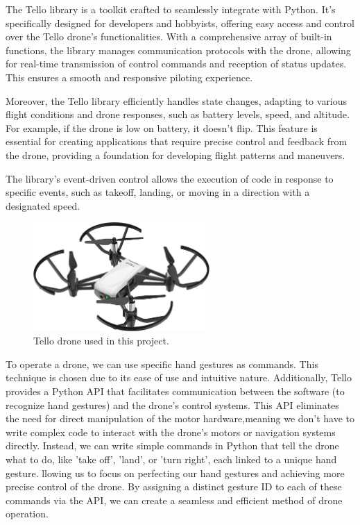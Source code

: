 The Tello library is a toolkit crafted to seamlessly integrate with Python. It's specifically designed for developers and hobbyists, offering easy access and control over the Tello drone's functionalities. With a comprehensive array of built-in functions, the library manages communication protocols with the drone, allowing for real-time transmission of control commands and reception of status updates. This ensures a smooth and responsive piloting experience.

Moreover, the Tello library efficiently handles state changes, adapting to various flight conditions and drone responses, such as battery levels, speed, and altitude. For example, if the drone is low on battery, it doesn't flip. This feature is essential for creating applications that require precise control and feedback from the drone, providing a foundation for developing flight patterns and maneuvers.

The library's event-driven control allows the execution of code in response to specific events, such as takeoff, landing, or moving in a direction with a designated speed.

\begin{figure}[h!]
	\centering
	\includegraphics[width = 0.6\textwidth]{images/drone.jpg}
	\caption{Tello drone used in this project.}
	\label{fig:tello}
\end{figure}

To operate a drone, we can use specific hand gestures as commands. This technique is chosen due to its ease of use and intuitive nature. Additionally, Tello provides a Python API that facilitates communication between the software (to recognize hand gestures) and the drone's control systems.
This API eliminates the need for direct manipulation of the motor hardware,meaning we don't have to write complex code to interact with the drone's motors or navigation systems directly.  Instead, we can write simple commands in Python that tell the drone what to do, like 'take off', 'land', or 'turn right', each linked to a unique hand gesture. 
llowing us to focus on perfecting our hand gestures and achieving more precise control of the drone. By assigning a distinct gesture ID to each of these commands via the API, we can create a seamless and efficient method of drone operation.



